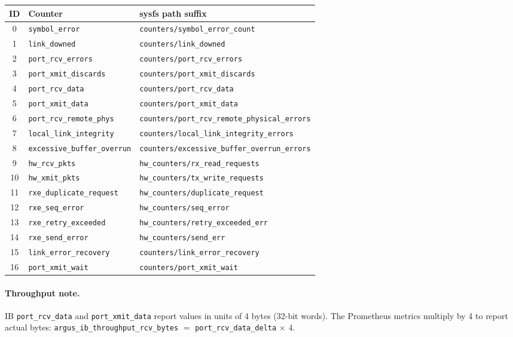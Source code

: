 \documentclass[11pt]{article}
\begin{document}
\begin{center}
\small
\begin{tabular}{clp{5.5cm}}
\toprule
ID & Counter & sysfs path suffix \\
\midrule
0  & \texttt{symbol\_error}             & \texttt{counters/symbol\_error\_count} \\
1  & \texttt{link\_downed}              & \texttt{counters/link\_downed} \\
2  & \texttt{port\_rcv\_errors}         & \texttt{counters/port\_rcv\_errors} \\
3  & \texttt{port\_xmit\_discards}      & \texttt{counters/port\_xmit\_discards} \\
4  & \texttt{port\_rcv\_data}           & \texttt{counters/port\_rcv\_data} \\
5  & \texttt{port\_xmit\_data}          & \texttt{counters/port\_xmit\_data} \\
6  & \texttt{port\_rcv\_remote\_phys}   & \texttt{counters/port\_rcv\_remote\_physical\_errors} \\
7  & \texttt{local\_link\_integrity}    & \texttt{counters/local\_link\_integrity\_errors} \\
8  & \texttt{excessive\_buffer\_overrun}& \texttt{counters/excessive\_buffer\_overrun\_errors} \\
9  & \texttt{hw\_rcv\_pkts}             & \texttt{hw\_counters/rx\_read\_requests} \\
10 & \texttt{hw\_xmit\_pkts}            & \texttt{hw\_counters/tx\_write\_requests} \\
11 & \texttt{rxe\_duplicate\_request}   & \texttt{hw\_counters/duplicate\_request} \\
12 & \texttt{rxe\_seq\_error}           & \texttt{hw\_counters/seq\_error} \\
13 & \texttt{rxe\_retry\_exceeded}      & \texttt{hw\_counters/retry\_exceeded\_err} \\
14 & \texttt{rxe\_send\_error}          & \texttt{hw\_counters/send\_err} \\
15 & \texttt{link\_error\_recovery}     & \texttt{counters/link\_error\_recovery} \\
16 & \texttt{port\_xmit\_wait}          & \texttt{counters/port\_xmit\_wait} \\
\bottomrule
\end{tabular}
\end{center}

\paragraph{Throughput note.}
IB \texttt{port\_rcv\_data} and \texttt{port\_xmit\_data} report values in
units of 4 bytes (32-bit words). The Prometheus metrics multiply by 4 to
report actual bytes: \texttt{argus\_ib\_throughput\_rcv\_bytes} $=$
\texttt{port\_rcv\_data\_delta} $\times$ $4$.
\end{document}
